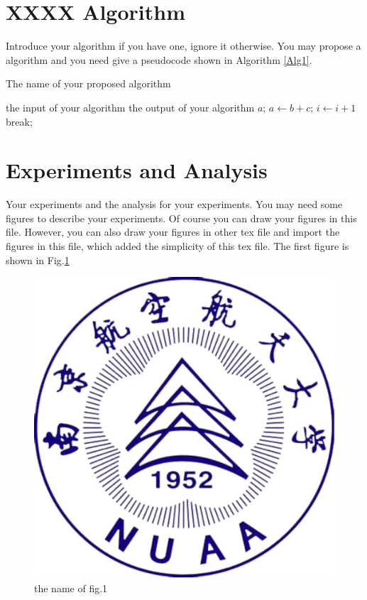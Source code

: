 \documentclass[twocolumn]{svjour3}          %
\begin{document}
\section{XXXX Algorithm}
Introduce your algorithm if you have one, ignore it otherwise.
You may propose a algorithm and you need give a pseudocode shown in Algorithm \ref{Alg1}.
\begin{algorithm}
  \caption{The name of your proposed algorithm}
  \label{Alg1}
  \begin{algorithmic}[1]%
    \Require the input of your algorithm
    \Ensure the output of your algorithm
       \State $a$;
       \State $a \gets b+c$;
          \State $i \gets i + 1$
            \State break;
          \EndIf
       \EndFor
    \EndProcedure
  \end{algorithmic}
\end{algorithm}


\section{Experiments and Analysis}
Your experiments and the analysis for your experiments.
You may need some figures to describe your experiments. Of course you can draw your figures in this file. However, you can also draw your figures in other tex file and import the figures in this file, which added the simplicity of this tex file. The first figure is shown in Fig.\ref{Fig1}
\begin{figure}
  \begin{center}
    \includegraphics[scale=0.5]{logo.eps}  %
    \caption{the name of fig.1}
    \label{Fig1}
  \end{center}
\end{figure}
\end{document}
